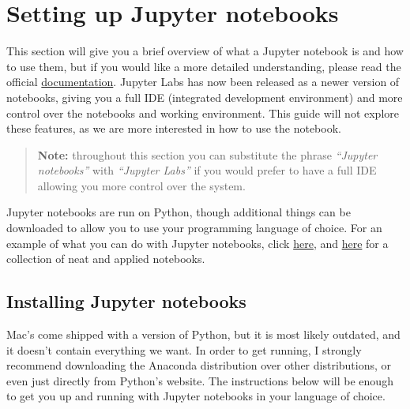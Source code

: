 \documentclass[]{book}
\begin{document}
\hypertarget{setting-up-jupyter-notebooks}{%
\section{Setting up Jupyter notebooks}\label{setting-up-jupyter-notebooks}}

This section will give you a brief overview of what a Jupyter notebook is and how to use them, but if you would like a more detailed understanding, please read the official \href{https://jupyter-notebook.readthedocs.io/en/stable/notebook.html}{documentation}. Jupyter Labs has now been released as a newer version of notebooks, giving you a full IDE (integrated development environment) and more control over the notebooks and working environment. This guide will not explore these features, as we are more interested in how to use the notebook.

\begin{quote}
\textbf{Note:} throughout this section you can substitute the phrase \emph{``Jupyter notebooks''} with \emph{``Jupyter Labs''} if you would prefer to have a full IDE allowing you more control over the system.
\end{quote}

Jupyter notebooks are run on Python, though additional things can be downloaded to allow you to use your programming language of choice. For an example of what you can do with Jupyter notebooks, click \href{https://nbviewer.jupyter.org/github/CamDavidsonPilon/Probabilistic-Programming-and-Bayesian-Methods-for-Hackers/blob/master/Chapter1_Introduction/Ch1_Introduction_PyMC3.ipynb}{here}, and \href{https://Github.com/jupyter/jupyter/wiki/A-gallery-of-interesting-Jupyter-Notebooks\#programming-and-computer-science}{here} for a collection of neat and applied notebooks.

\hypertarget{installing-jupyter-notebooks}{%
\subsection{Installing Jupyter notebooks}\label{installing-jupyter-notebooks}}

Mac's come shipped with a version of Python, but it is most likely outdated, and it doesn't contain everything we want. In order to get running, I strongly recommend downloading the Anaconda distribution over other distributions, or even just directly from Python's website. The instructions below will be enough to get you up and running with Jupyter notebooks in your language of choice.
\end{document}
